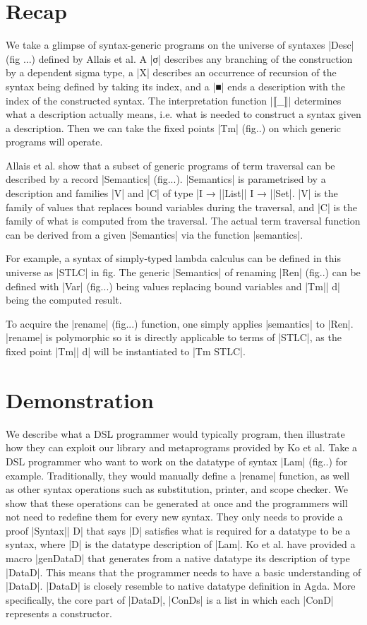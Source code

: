\documentclass[sigplan,review,fleqn]{acmart}
\renewcommand{\verb}{\collectverb{\color{AgdaFunction}}}
\newcommand{\con}{\collectverb{\color{AgdaInductiveConstructor}}}
\newcommand{\macro}{\collectverb{\color{AgdaMacro}}}
\newcommand{\name}{\collectverb{\color{AgdaSymbol}}}
\begin{document}
\section{Recap}
We take a glimpse of syntax-generic programs on the universe of syntaxes \verb|Desc| (fig ...) defined by Allais et al.
A \con|σ| describes any branching of the construction by a dependent sigma type, a \con|X| describes an occurrence of recursion of the syntax being defined by taking its index, and a \con|■| ends a description with the index of the constructed syntax.
The interpretation function \verb|⟦_⟧| determines what a description actually means, i.e. what is needed to construct a syntax given a description.
Then we can take the fixed points \verb|Tm| (fig..) on which generic programs will operate.

Allais et al. show that a subset of generic programs of term traversal can be described by a record \verb|Semantics| (fig...).
\verb|Semantics| is parametrised by a description and families \name|V| and \name|C| of type \name|I → |\verb|List|\name| I → |\verb|Set|.
\name|V| is the family of values that replaces bound variables during the traversal, and \name|C| is the family of what is computed from the traversal.
The actual term traversal function can be derived from a given \verb|Semantics| via the function \verb|semantics|.

For example, a syntax of simply-typed lambda calculus can be defined in this universe as \verb|STLC| in fig.
The generic \verb|Semantics| of renaming \verb|Ren| (fig..) can be defined with \verb|Var| (fig...) being values replacing bound variables and \verb|Tm|\name| d| being the computed result.

To acquire the \verb|rename| (fig...) function, one simply applies \verb|semantics| to \verb|Ren|.
\verb|rename| is polymorphic so it is directly applicable to terms of \verb|STLC|, as the fixed point \verb|Tm|\name| d| will be instantiated to \verb|Tm STLC|. 


\section{Demonstration}
We describe what a DSL programmer would typically program, then illustrate how they can exploit our library and metaprograms provided by Ko et al.
Take a DSL programmer who want to work on the datatype of syntax \verb|Lam| (fig..) for example.
Traditionally, they would manually define a \verb|rename| function, as well as other syntax operations such as substitution, printer, and scope checker.
We show that these operations can be generated at once and the programmers will not need to redefine them for every new syntax.
They only needs to provide a proof \verb|Syntax|\name| D| that says \name|D| satisfies what is required for a datatype to be a syntax, where \name|D| is the datatype description of \verb|Lam|. 
Ko et al. have provided a macro \macro|genDataD| that generates from a native datatype its description of type \verb|DataD|.
This means that the programmer needs to have a basic understanding of \verb|DataD|.
\verb|DataD| is closely resemble to native datatype definition in Agda.
More specifically, the core part of \verb|DataD|, \verb|ConDs| is a list in which each \verb|ConD| represents a constructor.
\end{document}

